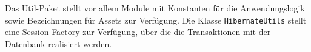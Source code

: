 \documentclass[enabledeprecatedfontcommands,fontsize=12pt,paper=a4,twoside,parskip=half]{scrartcl}
\begin{document}
Das Util-Paket stellt vor allem Module mit Konstanten für die Anwendungslogik sowie Bezeichnungen für Assets zur Verfügung. Die Klasse \texttt{HibernateUtils} stellt eine Session-Factory zur Verfügung, über die die Transaktionen mit der Datenbank realisiert werden.





\end{document}
